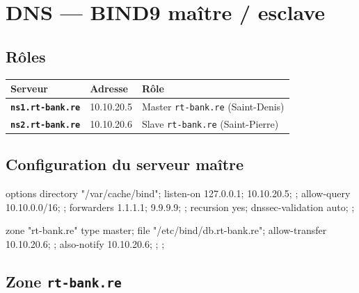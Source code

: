 \documentclass[11pt,a4paper]{article}
\begin{document}
\section{DNS — BIND9 maître / esclave}

\subsection{Rôles}

\renewcommand{\arraystretch}{1.3}
\begin{tabularx}{\linewidth}{@{}>{\bfseries}l l X@{}}
\toprule
\rowcolor{light} Serveur & Adresse & Rôle \\ \midrule
\texttt{ns1.rt-bank.re} & 10.10.20.5 & Master \texttt{rt-bank.re} (Saint-Denis) \\
\texttt{ns2.rt-bank.re} & 10.10.20.6 & Slave  \texttt{rt-bank.re} (Saint-Pierre) \\
\bottomrule
\end{tabularx}

\subsection{Configuration du serveur maître}

\begin{cfgbox}
options {
    directory "/var/cache/bind";
    listen-on { 127.0.0.1; 10.10.20.5; };
    allow-query { 10.10.0.0/16; };
    forwarders { 1.1.1.1; 9.9.9.9; };
    recursion yes;
    dnssec-validation auto;
};

zone "rt-bank.re" {
    type master;
    file "/etc/bind/db.rt-bank.re";
    allow-transfer { 10.10.20.6; };
    also-notify    { 10.10.20.6; };
};
\end{cfgbox}

\subsection{Zone \texttt{rt-bank.re}}

\end{document}
